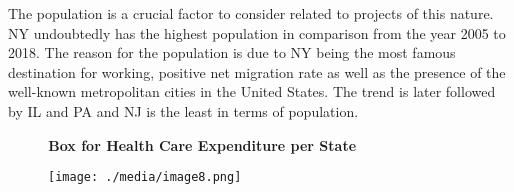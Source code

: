 \documentclass[12pt]{article}
\begin{document}

\par


\vspace{\baselineskip}
\begin{justify}
The population is a crucial factor to consider related to projects of this nature. NY undoubtedly has the highest population in comparison from the year 2005 to 2018. The reason for the population is due to NY being the most famous destination for working, positive net migration rate as well as the presence of the well-known metropolitan cities in the United States. The trend is later followed by IL and PA and NJ is the least in terms of population.
\end{justify}\par


\vspace{\baselineskip}

\vspace{\baselineskip}

\vspace{\baselineskip}

\vspace{\baselineskip}

\vspace{\baselineskip}

\vspace{\baselineskip}

\vspace{\baselineskip}

\vspace{\baselineskip}

\vspace{\baselineskip}

\vspace{\baselineskip}
\begin{adjustwidth}{1.5in}{0.0in}
\begin{justify}
\textbf{\ \ \ \ \  Box for Health Care Expenditure per State}
\end{justify}\par

\end{adjustwidth}




\begin{figure}[H]
	\begin{Center}
		\texttt{[image: ./media/image8.png]}
	\end{Center}
\end{figure}
\end{document}
